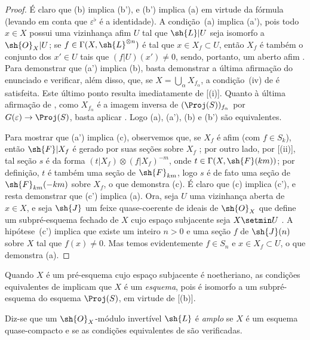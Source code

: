 \documentclass[oneside,10pt]{amsart}
\makeatletter
\newcommand{\ega@arrow}[2]{\mathchoice{#1}{#2}{#2}{#2}}
\renewcommand{\to}{\ega@arrow{\longrightarrow}{\rightarrow}}
\let\EGAOriginalLabel\label
\renewcommand{\label}[1]{\phantomsection\EGAOriginalLabel{#1}}
\makeatother
\begin{document}
\begin{proof}
É claro que (b) implica (b'), e (b') implica (a) em virtude da fórmula  (levando em conta que $\varepsilon^\flat$ é a identidade).
A condição~(a) implica (a'), pois todo $x\in X$ possui uma vizinhança afim $U$ tal que $\sh{L}|U$ seja isomorfo a $\sh{O}_X|U$;
se $f\in\Gamma(X,\sh{L}^{\otimes n})$ é tal que $x\in X_f\subset U$, então $X_f$ é também o conjunto dos $x'\in U$ tais que $(f|U)(x')\neq0$, sendo, portanto, um aberto afim .
Para demonstrar que (a') implica (b), basta demonstrar a última afirmação do enunciado e verificar, além disso, que, se $X=\bigcup_\alpha X_{f_\alpha}$, a condição~(iv) de  é satisfeita.
Este último ponto resulta imediatamente de [(i)].
Quanto à última afirmação de , como $X_{f_\alpha}$ é a imagem inversa de $(\Proj(S))_{f_\alpha}$ por $G(\varepsilon)\to\Proj(S)$, basta aplicar .
Logo (a), (a'), (b) e (b') são equivalentes.

Para mostrar que (a') implica (c), observemos que, se $X_f$ é afim (com $f\in S_k$), então $\sh{F}|X_f$ é gerado por suas seções sobre $X_f$ ;
por outro lado, por [(ii)], tal seção $s$ é da forma $(t|X_f)\otimes(f|X_f)^{-m}$, onde $t\in\Gamma(X,\sh{F}(km))$;
por definição, $t$ é também uma seção de $\sh{F}_{km}$, logo $s$ é de fato uma seção de $\sh{F}_{km}(-km)$ sobre $X_f$, o que demonstra (c).
É claro que (c) implica (c'), e resta demonstrar que (c') implica (a).
Ora, seja $U$ uma vizinhança aberta de $x\in X$, e seja $\sh{J}$ um feixe quase-coerente de ideais de $\sh{O}_X$ que define um subpré-esquema fechado de $X$ cujo espaço subjacente seja $X\setmin U$ .
A hipótese~(c') implica que existe um inteiro $n>0$ e uma seção $f$ de $\sh{J}(n)$ sobre $X$ tal que $f(x)\neq0$.
Mas temos evidentemente $f\in S_n$ e $x\in X_f\subset U$, o que demonstra (a).
\end{proof}

Quando $X$ é um pré-esquema cujo espaço subjacente é noetheriano, as condições equivalentes de  implicam que $X$ é um \emph{esquema}, pois é isomorfo a um subpré-esquema do esquema $\Proj(S)$, em virtude de [(b)].

\begin{definition}[4.5.3]
\label{II.4.5.3}
Diz-se que um $\sh{O}_X$-módulo invertível $\sh{L}$ é \emph{amplo} se $X$ é um esquema quase-compacto e se as condições equivalentes de  são verificadas.
\end{definition}
\end{document}
